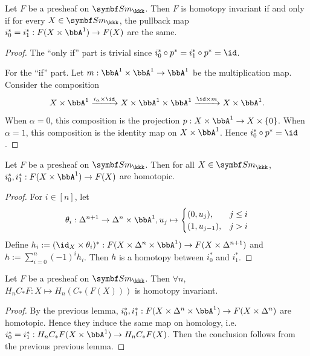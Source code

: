   \begin{lemma}
    Let $F$ be a presheaf on $\Sm_{\kkk}$.
    Then $F$ is homotopy invariant if and only if for every $X \in \Sm_{\kkk}$, the pullback map $i_0^* = i_1^*: F(X \times \bbA^1) \to F(X)$ are the same.
  \end{lemma}
  \begin{proof}
    The ``only if'' part is trivial since $i_0^* \circ p^* = i_1^* \circ p^* = \id$.

    For the ``if'' part.
    Let $m: \bbA^1 \times \bbA^1 \to \bbA^1$ be the multiplication map.
    Consider the composition
    \[ X \times \bbA^1 \xrightarrow{i_\alpha \times \id} X \times \bbA^1 \times \bbA^1 \xrightarrow{\id \times m} X \times \bbA^1. \]
    When $\alpha = 0$, this composition is the projection $p: X \times \bbA^1 \to X \times \{0\}$.
    When $\alpha = 1$, this composition is the identity map on $X \times \bbA^1$.
    Hence $i_0^* \circ p^* = \id$.
  \end{proof}

  \begin{lemma}
    Let $F$ be a presheaf on $\Sm_{\kkk}$.
    Then for all $X \in \Sm_{\kkk}$, $i_0^*, i_1^*: F(X \times \bbA^1) \to F(X)$ are homotopic.
  \end{lemma}
  \begin{proof}
    For $i \in [n]$, let 
    \[ \theta_i: \Delta^{n+1} \to \Delta^n \times \bbA^1, u_j \mapsto \begin{cases}
      (0, u_j), & j \leq i \\
      (1, u_{j-1}), & j > i
    \end{cases} \]
    Define $h_i := (\id_X \times \theta_i)^* : F(X \times \Delta^n \times \bbA^1) \to F(X \times \Delta^{n+1})$ and $h := \sum_{i=0}^n (-1)^i h_i$.
    Then $h$ is a homotopy between $i_0^*$ and $i_1^*$.
  \end{proof}

  \begin{proposition}
    Let $F$ be a presheaf on $\Sm_{\kkk}$.
    Then $\forall n$, $H_nC_*F: X \mapsto H_n(C_*(F(X)))$ is homotopy invariant.
  \end{proposition}
  \begin{proof}
    By the previous lemma, $i_0^*, i_1^*: F(X \times \Delta^n \times \bbA^1) \to F(X \times \Delta^n)$ are homotopic.
    Hence they induce the same map on homology, i.e. $i_0^* = i_1^*: H_nC_*F(X \times \bbA^1) \to H_nC_*F(X)$.
    Then the conclusion follows from the previous previous lemma.
  \end{proof}


